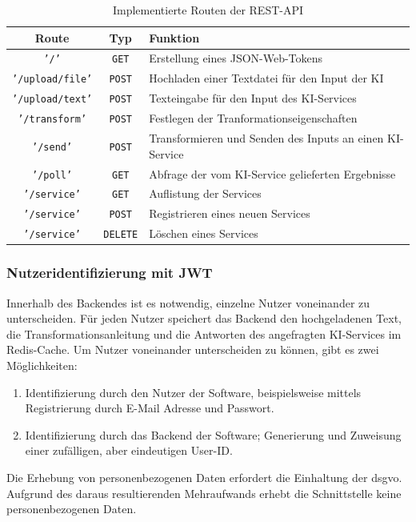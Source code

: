 \begin{table}[H]
\centering
\begin{tabular}{c|c|l}
\textbf{Route} & \textbf{Typ} & \textbf{Funktion}\\
\hline
\texttt{'/'} & \texttt{GET} & Erstellung eines JSON-Web-Tokens\\
\hline
\texttt{'/upload/file'}  & \texttt{POST} & Hochladen einer Textdatei für den Input der KI \\
\texttt{'/upload/text'}  & \texttt{POST} & Texteingabe für den Input des KI-Services \\    
\texttt{'/transform'}  & \texttt{POST} & Festlegen der Tranformationseigenschaften\\ 
\texttt{'/send'}  & \texttt{POST} & Transformieren und Senden des Inputs an einen KI-Service \\ 
\texttt{'/poll'}  & \texttt{GET} & Abfrage der vom KI-Service gelieferten Ergebnisse \\ 
\hline
\texttt{'/service'}  & \texttt{GET} & Auflistung der Services \\
\texttt{'/service'}  & \texttt{POST} & Registrieren eines neuen Services \\ 
\texttt{'/service'}  & \texttt{DELETE} & Löschen eines Services \\       
\end{tabular}
\caption{Implementierte Routen der REST-API}
\end{table}

\subsubsection{Nutzeridentifizierung mit JWT}
Innerhalb des Backendes ist es notwendig, einzelne Nutzer voneinander zu unterscheiden. Für jeden Nutzer speichert das Backend den hochgeladenen Text, die Transformationsanleitung und die Antworten des angefragten KI-Services im Redis-Cache. Um Nutzer voneinander unterscheiden zu können, gibt es zwei Möglichkeiten:
\begin{enumerate}
\item Identifizierung durch den Nutzer der Software, beispielsweise mittels Registrierung durch E-Mail Adresse und Passwort.
\item Identifizierung durch das Backend der Software; Generierung und Zuweisung einer zufälligen, aber eindeutigen User-ID.
\end{enumerate}

Die Erhebung von personenbezogenen Daten erfordert die Einhaltung der \ac{dsgvo}. Aufgrund des daraus resultierenden Mehraufwands erhebt die Schnittstelle keine personenbezogenen Daten.

